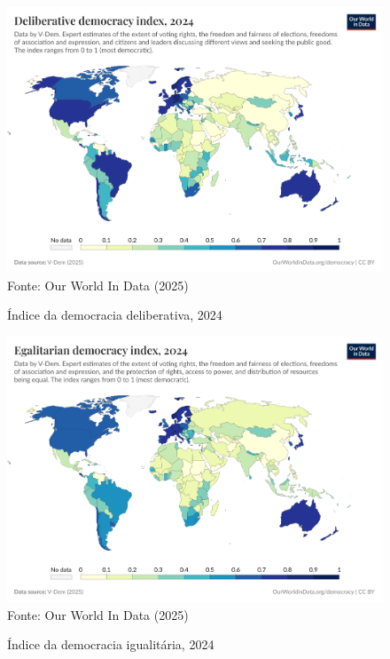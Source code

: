 \begin{figure}[ht]
    \centering
    \caption{Índice da democracia deliberativa, 2024}
    \includegraphics[width=1\linewidth]{figuras/democracia/deliberative-democracy-index-vdem.png}
    \label{fig:deliberative-democracy-index-vdem}
    \footnotesize{Fonte: Our World In Data (2025)}
\end{figure}

\begin{figure}[ht]
    \centering
    \caption{Índice da democracia igualitária, 2024}
    \includegraphics[width=1\linewidth]{figuras/democracia/egalitarian-democracy-index-vdem.png}
    \label{fig:egalitarian-democracy-index-vdem}
    \footnotesize{Fonte: Our World In Data (2025)}
\end{figure}

